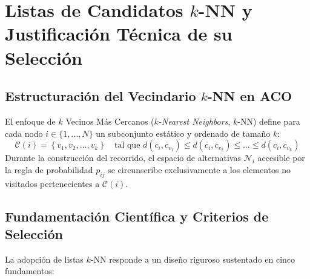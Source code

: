 \documentclass[11pt,a4paper]{article}
\begin{document}
\section{Listas de Candidatos \texorpdfstring{$k$-NN}{k-NN} y Justificación Técnica de su Selección}

\subsection{Estructuración del Vecindario \texorpdfstring{$k$-NN}{k-NN} en ACO}
El enfoque de $k$ Vecinos Más Cercanos (\emph{$k$-Nearest Neighbors}, $k$-NN) define para cada nodo $i \in \{1, \dots, N\}$ un subconjunto estático y ordenado de tamaño $k$:
\begin{equation}
    \mathcal{C}(i) = \left\{ v_1, v_2, \dots, v_k \right\} \quad \text{tal que } d(c_i, c_{v_1}) \le d(c_i, c_{v_2}) \le \dots \le d(c_i, c_{v_k})
\end{equation}
Durante la construcción del recorrido, el espacio de alternativas $\mathcal{N}_i$ accesible por la regla de probabilidad $p_{ij}$ se circunscribe exclusivamente a los elementos no visitados pertenecientes a $\mathcal{C}(i)$.

\subsection{Fundamentación Científica y Criterios de Selección}
La adopción de listas $k$-NN responde a un diseño riguroso sustentado en cinco fundamentos:
\end{document}
